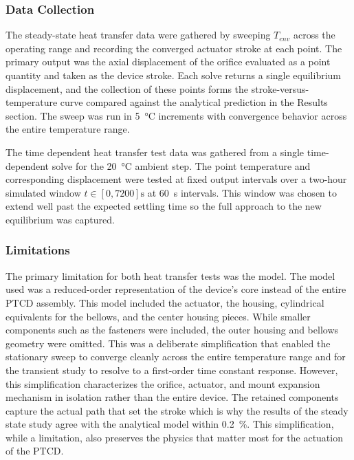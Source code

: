 \documentclass[12pt, letterpaper]{report}%
\newcounter{mycounter}           %
\newcounter{sub}[mycounter]      %
\begin{document}
		\subsubsection{Data Collection}

			The steady-state heat transfer data were gathered by sweeping $T_{env}$ across
			the operating range and recording the converged actuator stroke at each point.
			The primary output was the axial displacement of the orifice evaluated as a
			point quantity and taken as the device stroke. Each solve returns a single
			equilibrium displacement, and the collection of these points forms the
			stroke-versus-temperature curve compared against the analytical prediction in
			the Results section. The sweep was run in \SI{5}{\degreeCelsius} increments with
			convergence behavior across the entire temperature range.

			The time dependent heat transfer test data was gathered from a single
			time-dependent solve for the \SI{20}{\degreeCelsius} ambient step. The point
			temperature and corresponding displacement were tested at fixed output intervals over a
			two-hour simulated window $t \in [0, 7200] \si{\second}$ at \SI{60}{\second} intervals. This window was chosen
			to extend well past the expected settling time so the full approach to the new
			equilibrium was captured.

		\subsubsection{Limitations}

			The primary limitation for both heat transfer tests was the model. The model
			used was a reduced-order representation of the device's core instead of the
			entire PTCD assembly. This model included the actuator, the housing, cylindrical
			equivalents for the bellows, and the center housing pieces. While smaller
			components such as the fasteners were included, the outer housing and bellows
			geometry were omitted. This was a deliberate simplification that enabled the
			stationary sweep to converge cleanly across the entire temperature range and
			for the transient study to resolve to a first-order time constant response.
			However, this simplification characterizes the orifice, actuator, and mount
			expansion mechanism in isolation rather than the entire device. The retained
			components capture the actual path that set the stroke which is why the results
			of the steady state study agree with the analytical model within
			\SI{0.2}{\percent}. This simplification, while a limitation, also preserves the
			physics that matter most for the actuation of the PTCD.
\end{document}
